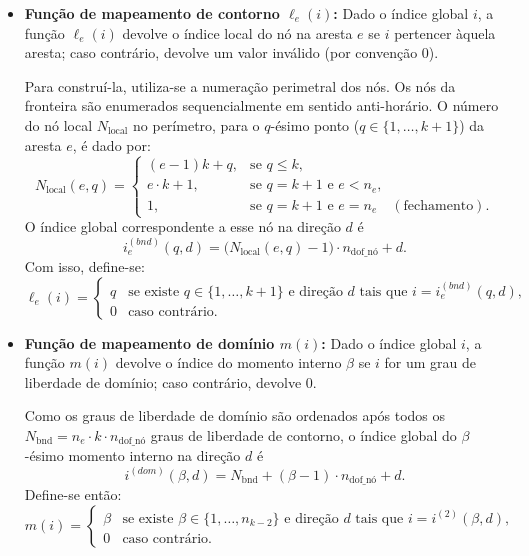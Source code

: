 \begin{itemize}
    \item \textbf{Função de mapeamento de contorno $\ell_e(i)$:}  
    Dado o índice global $i$, a função $\ell_e(i)$ devolve o índice local do nó na aresta $e$ se $i$ pertencer àquela aresta; caso contrário, devolve um valor inválido (por convenção $0$).

    Para construí-la, utiliza-se a numeração perimetral dos nós. Os nós da fronteira são enumerados sequencialmente em sentido anti-horário. O número do nó local $N_{\text{local}}$ no perímetro, para o $q$-ésimo ponto ($q \in \{1,\dots,k+1\}$) da aresta $e$, é dado por:
    \begin{equation}
        N_{\text{local}}(e, q) = 
        \begin{cases} 
            (e - 1)k + q, & \text{se } q \le k, \\
            e \cdot k + 1, & \text{se } q = k+1 \text{ e } e < n_e, \\
            1, & \text{se } q = k+1 \text{ e } e = n_e \quad (\text{fechamento}).
        \end{cases}
    \end{equation}
    O índice global correspondente a esse nó na direção $d$ é
    \[
    i_e^{(bnd)}(q,d) = \bigl(N_{\text{local}}(e,q) - 1\bigr) \cdot n_{\text{dof\_nó}} + d.
    \]
    Com isso, define-se:
    \[
    \ell_e(i) = 
    \begin{cases}
        q & \text{se existe } q\in\{1,\dots,k+1\} \text{ e direção } d \text{ tais que } i = i_e^{(bnd)}(q,d), \\
        0 & \text{caso contrário.}
    \end{cases}
    \]

    \item \textbf{Função de mapeamento de domínio $m(i)$:}  
    Dado o índice global $i$, a função $m(i)$ devolve o índice do momento interno $\beta$ se $i$ for um grau de liberdade de domínio; caso contrário, devolve $0$.

    Como os graus de liberdade de domínio são ordenados após todos os $N_{\mathrm{bnd}} = n_e \cdot k \cdot n_{\text{dof\_nó}}$ graus de liberdade de contorno, o índice global do $\beta$-ésimo momento interno na direção $d$ é
    \[
    i^{(dom)}(\beta,d) = N_{\mathrm{bnd}} + (\beta - 1) \cdot n_{\text{dof\_nó}} + d.
    \]
    Define-se então:
    \[
    m(i) = 
    \begin{cases}
        \beta & \text{se existe } \beta\in\{1,\dots,n_{k-2}\} \text{ e direção } d \text{ tais que } i = i^{(2)}(\beta,d), \\
        0 & \text{caso contrário.}
    \end{cases}
    \]
\end{itemize}

